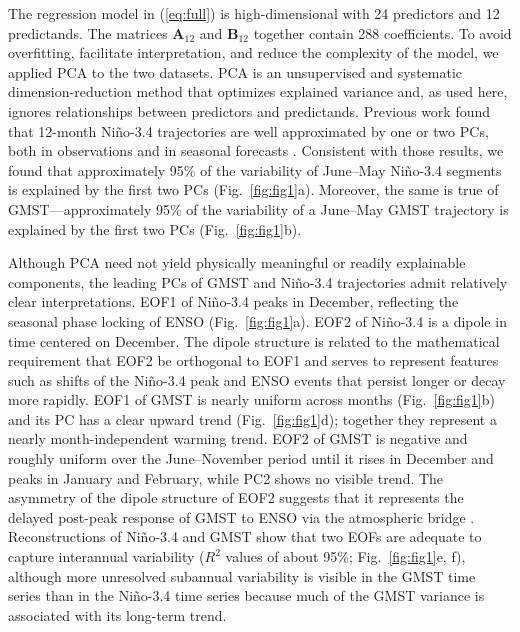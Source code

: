 \documentclass[draft]{agujournal2019}
\begin{document}
The regression model in (\ref{eq:full}) is high-dimensional with 24 predictors and 12 predictands. The matrices $\bm{A}_{12}$ and $\bm{B}_{12}$ together contain 288 coefficients. To avoid overfitting, facilitate interpretation, and reduce the complexity of the model, we applied PCA to the two datasets. PCA is an unsupervised and systematic dimension-reduction method that optimizes explained variance and, as used here, ignores relationships between predictors and predictands. Previous work found that 12-month Ni\~no-3.4 trajectories are well approximated by one or two PCs, both in observations and in seasonal forecasts \cite{Bunge2009verified,Tippett2019:ENSO}. Consistent with those results, we found that approximately 95\% of the variability of June--May Ni\~no-3.4 segments is explained by the first two PCs (Fig.\ \ref{fig:fig1}a). Moreover, the same is true of GMST---approximately 95\% of the variability of a June--May GMST trajectory is explained by the first two PCs (Fig.\ \ref{fig:fig1}b).

Although PCA need not yield physically meaningful or readily explainable components, the leading PCs of GMST and Ni\~no-3.4 trajectories admit relatively clear interpretations. EOF1 of Ni\~no-3.4 peaks in December, reflecting the seasonal phase locking of ENSO (Fig.\ \ref{fig:fig1}a).  EOF2 of Ni\~no-3.4 is a dipole in time centered on December. The dipole structure is related to the mathematical requirement that EOF2 be orthogonal to EOF1 and serves to represent features such as shifts of the Ni\~no-3.4 peak and ENSO events that persist longer or decay more rapidly. EOF1 of GMST is nearly uniform across months (Fig.\ \ref{fig:fig1}b) and its PC has a clear upward trend (Fig.\ \ref{fig:fig1}d); together they represent a nearly month-independent warming trend. EOF2 of GMST is negative and roughly uniform over the June--November period until it rises in December and peaks in January and February, while PC2 shows no visible trend. The asymmetry of the dipole structure of EOF2 suggests that it represents the delayed post-peak response of GMST to ENSO via the atmospheric bridge \cite{Alexander2002atmospheric,Klein1999remote}. Reconstructions of Ni\~no-3.4 and GMST show that two EOFs are adequate to capture interannual variability ($R^2$ values of about 95\%; Fig.\ \ref{fig:fig1}e, f), although more unresolved subannual variability is visible in the GMST time series than in the Ni\~no-3.4 time series because much of the GMST variance is associated with its long-term trend.
\end{document}
